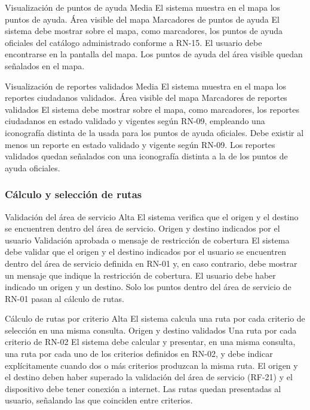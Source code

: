   {Visualización de puntos de ayuda}%
  {Media}%
  {El sistema muestra en el mapa los puntos de ayuda.}%
  {Área visible del mapa}%
  {Marcadores de puntos de ayuda}%
  {El sistema debe mostrar sobre el mapa, como marcadores, los puntos de ayuda oficiales del catálogo administrado conforme a RN-15.}%
  {El usuario debe encontrarse en la pantalla del mapa.}%
  {Los puntos de ayuda del área visible quedan señalados en el mapa.}%

  {Visualización de reportes validados}%
  {Media}%
  {El sistema muestra en el mapa los reportes ciudadanos validados.}%
  {Área visible del mapa}%
  {Marcadores de reportes validados}%
  {El sistema debe mostrar sobre el mapa, como marcadores, los reportes ciudadanos en estado validado y vigentes según RN-09, empleando una iconografía distinta de la usada para los puntos de ayuda oficiales.}%
  {Debe existir al menos un reporte en estado validado y vigente según RN-09.}%
  {Los reportes validados quedan señalados con una iconografía distinta a la de los puntos de ayuda oficiales.}%

\subsubsection{Cálculo y selección de rutas}

  {Validación del área de servicio}%
  {Alta}%
  {El sistema verifica que el origen y el destino se encuentren dentro del área de servicio.}%
  {Origen y destino indicados por el usuario}%
  {Validación aprobada o mensaje de restricción de cobertura}%
  {El sistema debe validar que el origen y el destino indicados por el usuario se encuentren dentro del área de servicio definida en RN-01 y, en caso contrario, debe mostrar un mensaje que indique la restricción de cobertura.}%
  {El usuario debe haber indicado un origen y un destino.}%
  {Solo los puntos dentro del área de servicio de RN-01 pasan al cálculo de rutas.}%

  {Cálculo de rutas por criterio}%
  {Alta}%
  {El sistema calcula una ruta por cada criterio de selección en una misma consulta.}%
  {Origen y destino validados}%
  {Una ruta por cada criterio de RN-02}%
  {El sistema debe calcular y presentar, en una misma consulta, una ruta por cada uno de los criterios definidos en RN-02, y debe indicar explícitamente cuando dos o más criterios produzcan la misma ruta.}%
  {El origen y el destino deben haber superado la validación del área de servicio (RF-21) y el dispositivo debe tener conexión a internet.}%
  {Las rutas quedan presentadas al usuario, señalando las que coinciden entre criterios.}%

